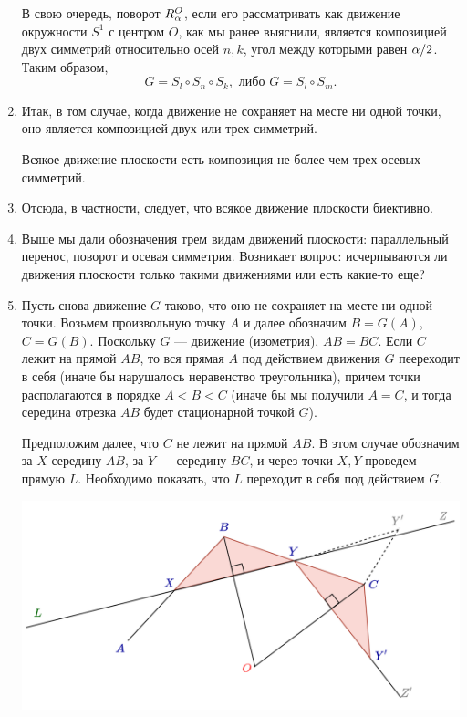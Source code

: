 \begin{enumerate}
В свою очередь, поворот $R^O_\alpha$, если его рассматривать как движение окружности $S^1$ с центром $O$, как мы ранее выяснили, является композицией двух симметрий относительно осей $n,k$, угол между которыми равен $\alpha/2$. Таким образом,
$$
G=S_l\circ S_n\circ S_k,\mbox{ либо }G=S_l\circ S_m.
$$

\item Итак, в том случае, когда движение не сохраняет на месте ни одной точки, оно является композицией двух или трех симметрий.
\begin{thrm}
Всякое движение плоскости есть композиция не более чем трех осевых симметрий.
\end{thrm}
\item Отсюда, в частности, следует, что всякое движение плоскости биективно.

\item Выше мы дали обозначения трем видам движений плоскости: параллельный перенос, поворот и осевая симметрия. Возникает вопрос: исчерпываются ли движения плоскости только такими движениями или есть какие-то еще?

\item Пусть снова движение $G$ таково, что оно не сохраняет на месте ни одной точки. Возьмем произвольную точку $A$ и далее обозначим $B=G(A)$, $C=G(B)$. Поскольку $G$ --- движение (изометрия), $AB=BC$. Если $C$ лежит на прямой $AB$, то вся прямая $A$ под действием движения $G$ пеереходит в себя (иначе бы нарушалось неравенство треугольника), причем точки располагаются в порядке $A<B<C$ (иначе бы мы получили $A=C$, и тогда середина отрезка $AB$ будет стационарной точкой $G$).

Предположим далее, что $C$ не лежит на прямой $AB$. В этом случае обозначим за $X$ середину $AB$, за $Y$ --- середину $BC$, и через точки $X,Y$ проведем прямую $L$. Необходимо показать, что $L$ переходит в себя под действием $G$.

\begin{center}
\includegraphics[scale=0.3]{Skolz.png}
\end{center}



\end{enumerate}
